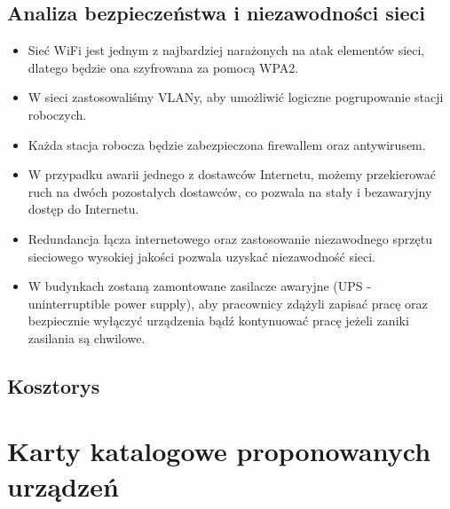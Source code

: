 \documentclass[a4paper,12pt]{extarticle}  %
\begin{document}
\subsection{Analiza bezpieczeństwa i niezawodności sieci}
\begin{itemize}
	\item Sieć WiFi jest jednym z najbardziej narażonych na atak elementów sieci, dlatego będzie ona szyfrowana za pomocą WPA2.
	\item W sieci zastosowaliśmy VLANy, aby umożliwić logiczne pogrupowanie stacji roboczych.
	\item Każda stacja robocza będzie zabezpieczona firewallem oraz antywirusem.
	\item W przypadku awarii jednego z dostawców Internetu, możemy przekierować ruch na dwóch pozostałych dostawców, co pozwala na stały i bezawaryjny dostęp do Internetu.
	\item Redundancja łącza internetowego oraz zastosowanie niezawodnego sprzętu sieciowego wysokiej jakości pozwala uzyskać niezawodność sieci.
	\item W budynkach zostaną zamontowane zasilacze awaryjne (UPS - uninterruptible power supply), aby pracownicy zdążyli zapisać pracę oraz bezpiecznie wyłączyć
	      urządzenia bądź kontynuować pracę jeżeli zaniki zasilania są chwilowe.
\end{itemize}
\subsection{Kosztorys}

\section{Karty katalogowe proponowanych urządzeń}
\end{document}
